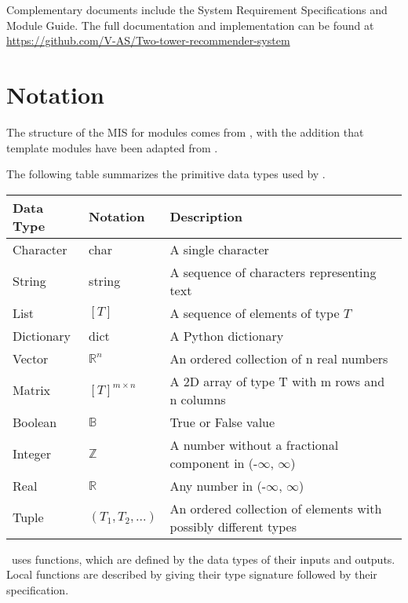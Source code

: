 \documentclass[12pt, titlepage]{article}
\begin{document}
Complementary documents include the System Requirement Specifications
and Module Guide.  The full documentation and implementation can be
found at \url{https://github.com/V-AS/Two-tower-recommender-system}

\section{Notation}

The structure of the MIS for modules comes from \citet{HoffmanAndStrooper1995},
with the addition that template modules have been adapted from
\cite{GhezziEtAl2003}.

The following table summarizes the primitive data types used by \progname. 

\begin{center}
\renewcommand{\arraystretch}{1.2}
\noindent 
\begin{tabular}{l l p{7.5cm}} 
\toprule 
\textbf{Data Type} & \textbf{Notation} & \textbf{Description}\\ 
\midrule
Character & char & A single character\\
String & string & A sequence of characters representing text\\
List & $[T]$ & A sequence of elements of type $T$\\
Dictionary & dict & A Python dictionary\\
Vector & $\mathbb{R}^n$ & An ordered collection of n real numbers\\
Matrix &$[T]^{m\times n}$ & A 2D array of type T with m rows and n columns\\
Boolean & $\mathbb{B}$ & True or False value\\
Integer & $\mathbb{Z}$ & A number without a fractional component in (-$\infty$, $\infty$) \\
Real & $\mathbb{R}$ & Any number in (-$\infty$, $\infty$)\\
Tuple & $(T_1, T_2, ...)$ & An ordered collection of elements with possibly different types\\
\bottomrule
\end{tabular} 
\end{center}

\noindent
\progname \ uses functions, which
are defined by the data types of their inputs and outputs. Local functions are
described by giving their type signature followed by their specification.
\end{document}
